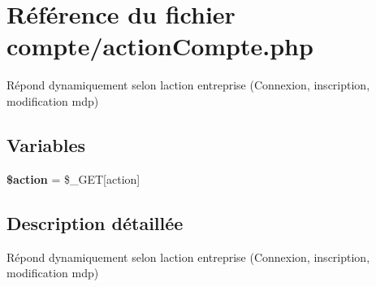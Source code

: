 \hypertarget{actionCompte_8php}{}\section{Référence du fichier compte/action\+Compte.php}
\label{actionCompte_8php}


Répond dynamiquement selon l\textquotesingle{}action entreprise (Connexion, inscription, modification mdp)  


\subsection*{Variables}
\begin{DoxyCompactItemize}
\item 
\mbox{\label{actionCompte_8php_aa698a3e72116e8e778be0e95d908ee30}} 
{\bfseries \$action} = \$\+\_\+\+G\+ET\mbox{[}\textquotesingle{}action\textquotesingle{}\mbox{]}
\end{DoxyCompactItemize}


\subsection{Description détaillée}
Répond dynamiquement selon l\textquotesingle{}action entreprise (Connexion, inscription, modification mdp) 

